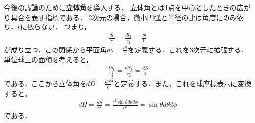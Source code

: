 \documentclass{report}
\begin{document}
  今後の議論のために\textbf{立体角}を導入する．
  立体角とは1点を中心としたときの広がり具合を表す指標である．
  2次元の場合，微小円弧と半径の比は角度にのみ依り，$r$に依らない．
  つまり，
  \begin{align}
    \frac{dl_1}{r_1}=\frac{dl_2}{r_2}=\frac{d\theta}{1}
  \end{align}
  が成り立つ．この関係から平面角$d\theta=\frac{dl}{r}$を定義する．これを3次元に拡張する．単位球上の面積を考えると，
  \begin{align}
    \frac{dS_1}{r_1^2}=\frac{dS_2}{r_2^2}=\frac{dS}{1}
  \end{align}
  である．ここから立体角を$d\Omega=\frac{dS}r^2$と定義する．また，これを球座標表示に変換すると，
  \begin{align}
    d\Omega = \frac{dS}{r^2} = \frac{r^2\sin\theta d\theta d\phi}{r^2} = \sin \theta d\theta d\phi
  \end{align}
  である．
\end{document}
